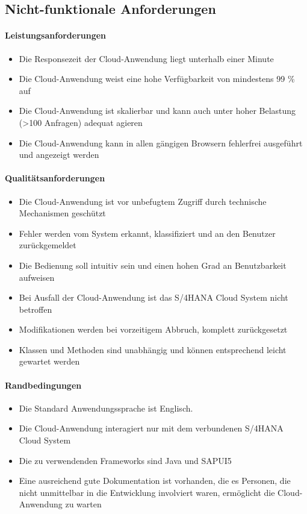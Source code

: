\subsection{Nicht-funktionale Anforderungen}

\paragraph{Leistungsanforderungen}
\begin{itemize}
    \item Die Responsezeit der Cloud-Anwendung liegt unterhalb einer Minute
    \item Die Cloud-Anwendung weist eine hohe Verfügbarkeit von mindestens 99 \% auf
    \item Die Cloud-Anwendung ist skalierbar und kann auch unter hoher Belastung (>100 Anfragen) adequat agieren
    \item Die Cloud-Anwendung kann in allen gängigen Browsern fehlerfrei ausgeführt und angezeigt werden
\end{itemize}
\paragraph{Qualitätsanforderungen}
\begin{itemize}
    \item Die Cloud-Anwendung ist vor unbefugtem Zugriff durch technische Mechanismen geschützt
    \item Fehler werden vom System erkannt, klassifiziert und an den Benutzer zurückgemeldet
    \item Die Bedienung soll intuitiv sein und einen hohen Grad an Benutzbarkeit aufweisen
    \item Bei Ausfall der Cloud-Anwendung ist das S/4HANA Cloud System nicht betroffen
    \item Modifikationen werden bei vorzeitigem Abbruch, komplett zurückgesetzt
    \item Klassen und Methoden sind unabhängig und können entsprechend leicht gewartet werden
\end{itemize}
\paragraph{Randbedingungen}
\begin{itemize}
    \item Die Standard Anwendungssprache ist Englisch.
    \item Die Cloud-Anwendung interagiert nur mit dem verbundenen S/4HANA Cloud System
    \item Die zu verwendenden Frameworks sind Java und SAPUI5
    \item Eine ausreichend gute Dokumentation ist vorhanden, die es Personen, die nicht unmittelbar in die Entwicklung involviert waren, ermöglicht die Cloud-Anwendung zu warten
\end{itemize}
% 
% 
% 
% 
% 
% 

